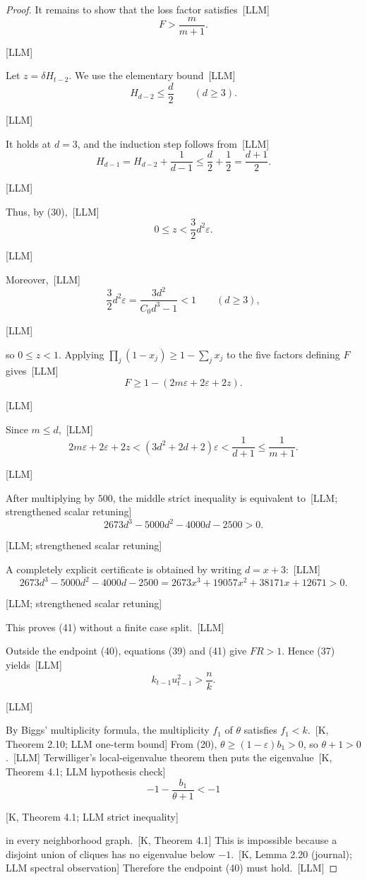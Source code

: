\documentclass[10pt]{amsart}
\theoremstyle{remark}
\newcommand{\eps}{\varepsilon}
\newcommand{\prov}[1]{\unskip\, {\normalfont\scriptsize\color{provgray}\textsf{[#1]}}}
\newcommand{\eqprov}[1]{%
  \par\nobreak\vspace{-0.68\baselineskip}%
  \noindent\hfill{\normalfont\scriptsize\color{provgray}\textsf{[#1]}}%
  \par\vspace{0.20\baselineskip}%
}
\begin{document}
\begin{proof}
It remains to show that the loss factor satisfies\prov{LLM}
\begin{equation}
F>\frac{m}{m+1}.
\end{equation}
\eqprov{LLM}
Let $z=\delta H_{t-2}$. We use the elementary bound\prov{LLM}
\begin{equation}
H_{d-2}\le\frac{d}{2}\qquad(d\ge3).
\end{equation}
\eqprov{LLM}
It holds at $d=3$, and the induction step follows from\prov{LLM}
\[
H_{d-1}=H_{d-2}+\frac1{d-1}\le\frac d2+\frac12=\frac{d+1}{2}.
\]
\eqprov{LLM}
Thus, by (30),\prov{LLM}
\[
0\le z<\frac32d^2\eps.
\]
\eqprov{LLM}
Moreover,\prov{LLM}
\[
\frac32d^2\eps=\frac{3d^2}{C_0d^3-1}<1\qquad(d\ge3),
\]
\eqprov{LLM}
so $0\le z<1$. Applying $\prod_j(1-x_j)\ge1-\sum_jx_j$ to the five factors defining $F$ gives\prov{LLM}
\[
F\ge1-(2m\eps+2\eps+2z).
\]
\eqprov{LLM}
Since $m\le d$,\prov{LLM}
\[
2m\eps+2\eps+2z<(3d^2+2d+2)\eps<\frac1{d+1}\le\frac1{m+1}.
\]
\eqprov{LLM}
After multiplying by $500$, the middle strict inequality is equivalent to\prov{LLM; strengthened scalar retuning}
\[
2673d^3-5000d^2-4000d-2500>0.
\]
\eqprov{LLM; strengthened scalar retuning}
A completely explicit certificate is obtained by writing $d=x+3$:\prov{LLM}
\[
2673d^3-5000d^2-4000d-2500
=2673x^3+19057x^2+38171x+12671>0.
\]
\eqprov{LLM; strengthened scalar retuning}
This proves (41) without a finite case split.\prov{LLM}

Outside the endpoint (40), equations (39) and (41) give $FR>1$. Hence (37) yields\prov{LLM}
\[
k_{t-1}u_{t-1}^2>\frac{n}{k}.
\]
\eqprov{LLM}
By Biggs' multiplicity formula, the multiplicity $f_1$ of $\theta$ satisfies $f_1<k$.\prov{K, Theorem 2.10; LLM one-term bound} From (20), $\theta\ge(1-\eps)b_1>0$, so $\theta+1>0$.\prov{LLM} Terwilliger's local-eigenvalue theorem then puts the eigenvalue\prov{K, Theorem 4.1; LLM hypothesis check}
\[
-1-\frac{b_1}{\theta+1}<-1
\]
\eqprov{K, Theorem 4.1; LLM strict inequality}
in every neighborhood graph.\prov{K, Theorem 4.1} This is impossible because a disjoint union of cliques has no eigenvalue below $-1$.\prov{K, Lemma 2.20 (journal); LLM spectral observation} Therefore the endpoint (40) must hold.\prov{LLM}


\end{proof}
\end{document}
